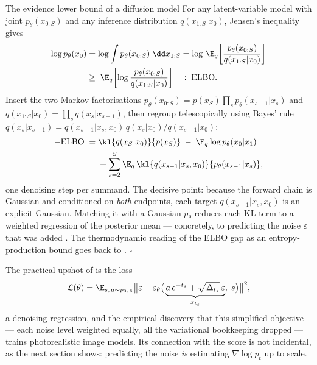 \begin{toolbox}{The evidence lower bound of a diffusion model}
For any latent-variable model with joint $p_\theta(x_{0:S})$ and any
inference distribution $q(x_{1:S} | x_0)$, Jensen's inequality gives
\begin{align*}
  \log p_\theta(x_0)
  &= \log \int p_\theta(x_{0:S})\;\dd x_{1:S}
   = \log\, \E_{q}\!\left[
      \frac{p_\theta(x_{0:S})}{q(x_{1:S}|x_0)} \right] \\
  &\geq\; \E_{q}\!\left[
      \log \frac{p_\theta(x_{0:S})}{q(x_{1:S}|x_0)} \right]
  \;=:\; \mathrm{ELBO}.
\end{align*}
Insert the two Markov factorisations
$p_\theta(x_{0:S}) = p(x_S) \prod_s p_\theta(x_{s-1}|x_s)$ and
$q(x_{1:S}|x_0) = \prod_s q(x_s|x_{s-1})$, then regroup telescopically using
Bayes' rule
$q(x_s|x_{s-1}) = q(x_{s-1}|x_s, x_0)\, q(x_s|x_0) / q(x_{s-1}|x_0)$:
\begin{align*}
  -\mathrm{ELBO}
  \;=\;& \kl{q(x_S|x_0)}{p(x_S)}
  \;-\; \E_q \log p_\theta(x_0 | x_1) \\
  &+ \sum_{s=2}^{S}
    \E_q\, \kl{q(x_{s-1}|x_s, x_0)}{p_\theta(x_{s-1}|x_s)} ,
\end{align*}
one denoising step per summand. The decisive point: because the forward
chain is Gaussian and conditioned on \emph{both} endpoints, each target
$q(x_{s-1} | x_s, x_0)$ is an explicit Gaussian. Matching it with a
Gaussian $p_\theta$ reduces each KL term to a weighted regression of the
posterior mean --- concretely, to predicting the noise $\varepsilon$ that
was added \citep{ho2020denoising}. The thermodynamic reading of the ELBO
gap as an entropy-production bound goes back to \citet{sohl2015deep}.
\hfill$\square$
\end{toolbox}

The practical upshot of \citet{ho2020denoising} is the loss
\begin{equation}
  \mathcal{L}(\theta)
  = \E_{s,\, a \sim p_0,\, \varepsilon}
    \big\| \varepsilon - \varepsilon_\theta\big(
      \underbrace{a\,e^{-t_s} + \sqrt{\Delta_{t_s}}\,\varepsilon}_{x_{t_s}},\; s
    \big) \big\|^2 ,
  \label{eq:ddpm-loss}
\end{equation}
a denoising regression, and the empirical discovery that this simplified
objective --- each noise level weighted equally, all the variational
bookkeeping dropped --- trains photorealistic image models. Its connection
with the score is not incidental, as the next section shows: predicting the
noise \emph{is} estimating $\nabla \log p_t$ up to scale.


